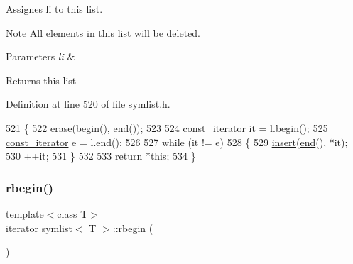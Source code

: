 Assignes {\ttfamily li} to this list. 

\begin{DoxyNote}{Note}
All elements in this list will be deleted.
\end{DoxyNote}

\begin{DoxyParams}{Parameters}
{\em li} & \\
\hline
\end{DoxyParams}
\begin{DoxyReturn}{Returns}
this list 
\end{DoxyReturn}


Definition at line 520 of file symlist.\+h.


\begin{DoxyCode}
521 \{
522     \mbox{\hyperlink{classsymlist_a75fc1fc7db7b20cc430ddb8577608904}{erase}}(\mbox{\hyperlink{classsymlist_a525b8d44af5d771fe15916372515cce0}{begin}}(), \mbox{\hyperlink{classsymlist_a7283589fa01f79d722f8256d7a6a7883}{end}}());
523 
524     \mbox{\hyperlink{classsymlist_af15c0ca931299054f83d17a1580a5159}{const\_iterator}} it = l.begin();
525     \mbox{\hyperlink{classsymlist_af15c0ca931299054f83d17a1580a5159}{const\_iterator}} e = l.end();
526 
527     \textcolor{keywordflow}{while} (it != e)
528     \{
529     \mbox{\hyperlink{classsymlist_a8b3327b8a33b180bf1eb802856f755c3}{insert}}(\mbox{\hyperlink{classsymlist_a7283589fa01f79d722f8256d7a6a7883}{end}}(), *it);
530     ++it;
531     \}
532     
533     \textcolor{keywordflow}{return} *\textcolor{keyword}{this};
534 \}
\end{DoxyCode}
\mbox{\label{classsymlist_ae5250e0c0c2bedee285f72584ddce29d}} 
\subsubsection{\texorpdfstring{rbegin()}{rbegin()}\hspace{0.1cm}{\footnotesize\ttfamily [1/2]}}
{\footnotesize\ttfamily template$<$class T$>$ \\
\mbox{\hyperlink{classsymlist_a66045fbe3d98975e5537092ede8b50df}{iterator}} \mbox{\hyperlink{classsymlist}{symlist}}$<$ T $>$\+::rbegin (\begin{DoxyParamCaption}{ }\end{DoxyParamCaption})\hspace{0.3cm}{\ttfamily [inline]}}



